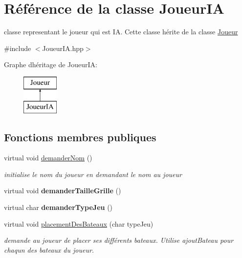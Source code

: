 \hypertarget{class_joueur_i_a}{}\section{Référence de la classe Joueur\+IA}
\label{class_joueur_i_a}


classe representant le joueur qui est IA. Cette classe hérite de la classe \hyperlink{class_joueur}{Joueur}  




{\ttfamily \#include $<$Joueur\+I\+A.\+hpp$>$}

Graphe d\textquotesingle{}héritage de Joueur\+IA\+:\begin{figure}[H]
\begin{center}
\leavevmode
\includegraphics[height=2.000000cm]{class_joueur_i_a}
\end{center}
\end{figure}
\subsection*{Fonctions membres publiques}
\begin{DoxyCompactItemize}
\item 
virtual void \hyperlink{class_joueur_i_a_a266a69042a52b6346cc2c6a5af9cf3ed}{demander\+Nom} ()\hypertarget{class_joueur_i_a_a266a69042a52b6346cc2c6a5af9cf3ed}{}\label{class_joueur_i_a_a266a69042a52b6346cc2c6a5af9cf3ed}

\begin{DoxyCompactList}\small\item\em initialise le nom du joueur en demandant le nom au joueur \end{DoxyCompactList}\item 
virtual void {\bfseries demander\+Taille\+Grille} ()\hypertarget{class_joueur_i_a_a06995dbbdb0ebc747d69f82a219fcd2f}{}\label{class_joueur_i_a_a06995dbbdb0ebc747d69f82a219fcd2f}

\item 
virtual char {\bfseries demander\+Type\+Jeu} ()\hypertarget{class_joueur_i_a_a6b8bc123fded1d1c5ce10e922689f618}{}\label{class_joueur_i_a_a6b8bc123fded1d1c5ce10e922689f618}

\item 
virtual void \hyperlink{class_joueur_i_a_a62bb7d4785bcb817102e41c3e9c9b84a}{placement\+Des\+Bateaux} (char type\+Jeu)
\begin{DoxyCompactList}\small\item\em demande au joueur de placer ses différents bateaux. Utilise ajout\+Bateau pour chaqun des bateaux du joueur. \end{DoxyCompactList}\end{DoxyCompactItemize}
